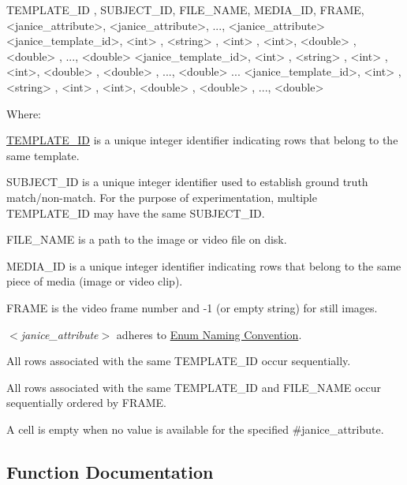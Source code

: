 \begin{DoxyVerb}TEMPLATE_ID        , SUBJECT_ID, FILE_NAME, MEDIA_ID, FRAME, <janice_attribute>, <janice_attribute>, ..., <janice_attribute>
<janice_template_id>, <int>     , <string> , <int>   , <int>, <double>         , <double>         , ..., <double>
<janice_template_id>, <int>     , <string> , <int>   , <int>, <double>         , <double>         , ..., <double>
...
<janice_template_id>, <int>     , <string> , <int>   , <int>, <double>         , <double>         , ..., <double>
\end{DoxyVerb}


Where\+:
\begin{DoxyItemize}
\item \hyperlink{group__janice_ga5ec62465fbbc7a92faadfefd3d20e25b}{T\+E\+M\+P\+L\+A\+T\+E\+\_\+\+I\+D} is a unique integer identifier indicating rows that belong to the same template.
\item {\ttfamily S\+U\+B\+J\+E\+C\+T\+\_\+\+I\+D} is a unique integer identifier used to establish ground truth match/non-\/match. For the purpose of experimentation, multiple {\ttfamily T\+E\+M\+P\+L\+A\+T\+E\+\_\+\+I\+D} may have the same {\ttfamily S\+U\+B\+J\+E\+C\+T\+\_\+\+I\+D}.
\item {\ttfamily F\+I\+L\+E\+\_\+\+N\+A\+M\+E} is a path to the image or video file on disk.
\item {\ttfamily M\+E\+D\+I\+A\+\_\+\+I\+D} is a unique integer identifier indicating rows that belong to the same piece of media (image or video clip).
\item {\ttfamily F\+R\+A\+M\+E} is the video frame number and -\/1 (or empty string) for still images.
\item {\itshape $<$janice\+\_\+attribute$>$} adheres to \hyperlink{janice_enum}{Enum Naming Convention}.
\item All rows associated with the same {\ttfamily T\+E\+M\+P\+L\+A\+T\+E\+\_\+\+I\+D} occur sequentially.
\item All rows associated with the same {\ttfamily T\+E\+M\+P\+L\+A\+T\+E\+\_\+\+I\+D} and {\ttfamily F\+I\+L\+E\+\_\+\+N\+A\+M\+E} occur sequentially ordered by {\ttfamily F\+R\+A\+M\+E}.
\item A cell is empty when no value is available for the specified \#janice\+\_\+attribute. 
\end{DoxyItemize}

\subsection{Function Documentation}
\hypertarget{group__janice__io_ga48b8438cfe4cfe35a3b2978c01c6df6e}{}
